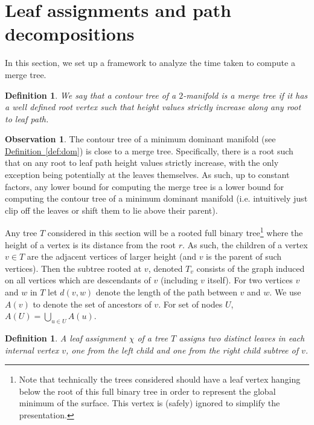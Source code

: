 \documentclass[11pt]{article}
\newtheorem{definition}[theorem]{Definition}
\theoremstyle{definition}
\newtheorem{observation}{Observation}
\newcommand{\Def}[1]{\hyperref[def:#1]{Definition~\ref*{def:#1}}} %
\begin{document}
\newcommand{\pathTree}{P_{\mathcal{S}}}
\newcommand{\pathTreeA}{\mathcal{P}_{\mathcal{S}}}
\section{Leaf assignments and path decompositions}

In this section, we set up a framework to analyze the time taken to compute a merge tree.

\begin{definition}
 We say that a contour tree of a $2$-manifold is a \emph{merge tree} if it has a well defined root vertex such that height values 
 strictly increase along any root to leaf path.
\end{definition}

\begin{observation}
 The contour tree of a minimum dominant manifold (see \Def{dom}) is close to a merge tree.  Specifically, there is a root such that on any root 
 to leaf path height values strictly increase, with the only exception being potentially at the leaves themselves.  As such, up to constant 
 factors, any lower bound for computing the merge tree is a lower bound for computing the contour tree of a minimum dominant
 manifold (i.e. intuitively just clip off the leaves or shift them to lie above their parent).
\end{observation}


Any tree $T$ considered in this section will be a rooted full binary tree\footnote{Note 
that technically the trees considered should have a leaf vertex hanging below the root of this 
full binary tree in order to represent the global minimum of the surface.  This vertex is 
(safely) ignored to simplify the presentation.} where the height of a vertex is its distance 
from the root $r$.  As such, the children of a vertex $v\in T$ are the adjacent vertices of larger height
(and $v$ is the parent of such vertices).  Then the subtree rooted at $v$, denoted $T_v$ consists of the graph induced on all 
vertices which are descendants of $v$ (including $v$ itself).  For two vertices $v$ and $w$ in $T$ let $d(v,w)$ denote the 
length of the path between $v$ and $w$.
We use $A(v)$ to denote the set of ancestors of $v$.
For set of nodes $U$, $A(U) = \bigcup_{u \in U} A(u)$.


\begin{definition}
 A \emph{leaf assignment} $\chi$ of a tree $T$ assigns \emph{two} distinct leaves in each internal vertex $v$,
 one from the left child and one from the right child subtree of $v$.
\end{definition}
\end{document}
